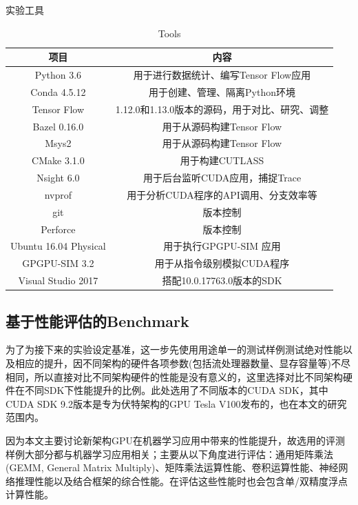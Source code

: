 \begin{table}[H]
	\centering
	\renewcommand{\thetable}{\arabic{section}-\arabic{table} }
	\renewcommand{\tablename}{表}
	\caption{实验工具}
	\addtocounter{table}{-1}
	\renewcommand{\thetable}{\arabic{section}-\arabic{table} }
	\renewcommand{\tablename}{Table}
	\caption{Tools}
	\begin{tabular}{cc}
		\toprule
		项目	&	内容\\
		\midrule
		Python 3.6		&	用于进行数据统计、编写Tensor Flow应用\\
		Conda 4.5.12		&	用于创建、管理、隔离Python环境\\
		Tensor Flow		&	1.12.0和1.13.0版本的源码，用于对比、研究、调整\\
		Bazel 0.16.0		&	用于从源码构建Tensor Flow\\
		Msys2		&	用于从源码构建Tensor Flow\\
		CMake 3.1.0		&	用于构建CUTLASS\\	
		Nsight 6.0	&	用于后台监听CUDA应用，捕捉Trace\\
		nvprof		&	用于分析CUDA程序的API调用、分支效率等\\
		git			&	版本控制\\
		Perforce	&	版本控制\\
		Ubuntu 16.04 Physical & 用于执行GPGPU-SIM 应用\\
		GPGPU-SIM 3.2 & 用于从指令级别模拟CUDA程序\\
		Visual Studio 2017 & 搭配10.0.17763.0版本的SDK\\
		\bottomrule
	\end{tabular} \label{table-实验工具} 
\end{table}
\subsection{基于性能评估的Benchmark}
\par 为了为接下来的实验设定基准，这一步先使用用途单一的测试样例测试绝对性能以及相应的提升，因不同架构的硬件各项参数(包括流处理器数量、显存容量等)不尽相同，所以直接对比不同架构硬件的性能是没有意义的，这里选择对比不同架构硬件在不同SDK下性能提升的比例。此处选用了不同版本的CUDA SDK，其中CUDA SDK 9.2版本是专为伏特架构的GPU Tesla V100发布的\cite{CUDA92}，也在本文的研究范围内。
\par 因为本文主要讨论新架构GPU在机器学习应用中带来的性能提升，故选用的评测样例大部分都与机器学习应用相关；主要从以下角度进行评估：通用矩阵乘法(GEMM, General Matrix Multiply)、矩阵乘法运算性能、卷积运算性能、神经网络推理性能以及结合框架的综合性能。在评估这些性能时也会包含单/双精度浮点计算性能。
